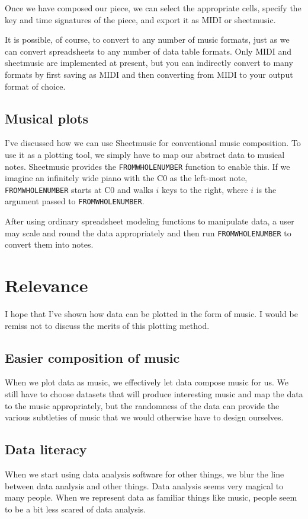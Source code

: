 \documentclass{acm_proc_article-sp}
\begin{document}
Once we have composed our piece, we can select the appropriate cells,
specify the key and time signatures of the piece, and export it as
MIDI or sheetmusic.

It is possible, of course, to convert to any number of music formats,
just as we can convert spreadsheets to any number of data table formats.
Only MIDI and sheetmusic are implemented at present, but you can
indirectly convert to many formats by first saving as MIDI and then
converting from MIDI to your output format of choice.

\subsection{Musical plots}
I've discussed how we can use Sheetmusic for conventional music
composition. To use it as a plotting tool, we simply have to map
our abstract data to musical notes. Sheetmusic provides the
\texttt{FROMWHOLENUMBER} function to enable this. If we imagine an
infinitely wide piano with the C0 as the left-most note,
\texttt{FROMWHOLENUMBER} starts at C0 and walks $i$ keys to the right,
where $i$ is the argument passed to \texttt{FROMWHOLENUMBER}.

After using ordinary spreadsheet modeling functions to manipulate data,
a user may scale and round the data appropriately and then run
\texttt{FROMWHOLENUMBER} to convert them into notes.

\section{Relevance}
I hope that I've shown how data can be plotted in the form of music.
I would be remiss not to discuss the merits of this plotting method.

\subsection{Easier composition of music}
When we plot data as music, we effectively let data compose music for us.
We still have to choose datasets that will produce interesting music and
map the data to the music appropriately, but the randomness of the data
can provide the various subtleties of music that we would otherwise have
to design ourselves.

\subsection{Data literacy}
When we start using data analysis software for other things,
we blur the line between data analysis and other things.
Data analysis seems very magical to many people. When we represent
data as familiar things like music, people seem to be a bit less
scared of data analysis.
\end{document}
